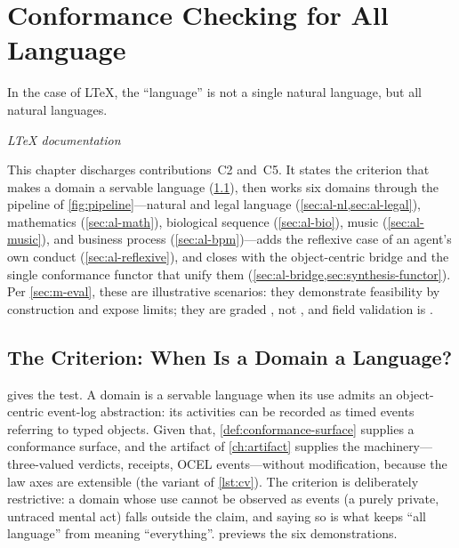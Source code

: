 \chapter{Conformance Checking for All Language}
\label{ch:all-language}

\epigraph{In the case of LTeX, the ``language'' is not a single natural language,
but all natural languages.}{\textit{LTeX documentation} \citep{ltex}}

This chapter discharges contributions~C2 and~C5. It states the criterion that
makes a domain a servable language (\cref{sec:al-criterion}), then works six
domains through the pipeline of \cref{fig:pipeline}---natural and legal language
(\cref{sec:al-nl,sec:al-legal}), mathematics (\cref{sec:al-math}), biological
sequence (\cref{sec:al-bio}), music (\cref{sec:al-music}), and business process
(\cref{sec:al-bpm})---adds the reflexive case of an agent's own conduct
(\cref{sec:al-reflexive}), and closes with the object-centric bridge and the single
conformance functor that unify them (\cref{sec:al-bridge,sec:synthesis-functor}).
Per \cref{sec:m-eval}, these are illustrative scenarios:
they demonstrate feasibility by construction and expose limits; they are graded
\candidate, not \admitted, and field validation is \openstat.

\section{The Criterion: When Is a Domain a Language?}
\label{sec:al-criterion}

 gives the test. A domain is a servable language when its use
admits an object-centric event-log abstraction: its activities can be recorded as
timed events referring to typed objects. Given that, \cref{def:conformance-surface}
supplies a conformance surface, and the artifact of \cref{ch:artifact} supplies
the machinery---three-valued verdicts, receipts, OCEL events---without
modification, because the law axes are extensible (the  variant of
\cref{lst:cv}). The criterion is deliberately restrictive: a domain whose use
cannot be observed as events (a purely private, untraced mental act) falls
outside the claim, and saying so is what keeps ``all language'' from meaning
``everything''.  previews the six demonstrations.

